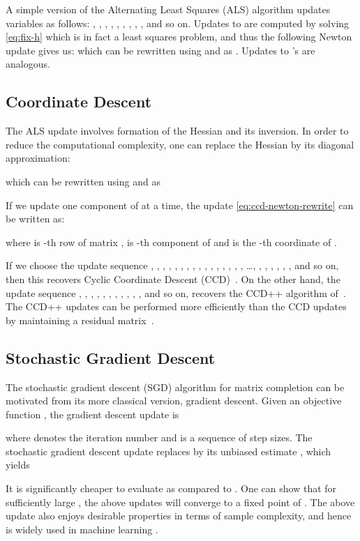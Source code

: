 \documentclass{vldb}
\begin{document}
A simple version of the Alternating Least Squares (ALS) algorithm
updates variables as follows: , , , ,
, , , , ,  and so
on. Updates to  are computed by solving \eqref{eq:fix-h} which
is in fact a least squares problem, and thus the following Newton update
gives us: 
which can be rewritten using  and  as .  Updates to 's are analogous.


\subsection{Coordinate Descent}
\label{sec:CoordinateDescent}

The ALS update involves formation of the Hessian and its inversion.  In
order to reduce the computational complexity, one can replace the
Hessian by its diagonal approximation:

which can be rewritten using  and  as 

If we update one component of  at a time, the update
\eqref{eq:ccd-newton-rewrite} can be written as:

where  is -th row of matrix ,  is -th component
of  and  is the -th coordinate of .

If we choose the update sequence , , , ,
, , , , , , ,
, , , , , \ldots, ,
, , , , , and so on, then this
recovers Cyclic Coordinate Descent (CCD)~\cite{HsiDhi11}. On the other
hand, the update sequence , , , ,
, , , , , , ,
 and so on, recovers the CCD++ algorithm
of~\citet{YuHsiSiDhi12}. The CCD++ updates can be performed more
efficiently than the CCD updates by maintaining a residual
matrix~\citep{YuHsiSiDhi12}.

\subsection{Stochastic Gradient Descent}
\label{sec:StochGradDesc}

The stochastic gradient descent (SGD) algorithm for matrix completion
can be motivated from its more classical version, gradient
descent. Given an objective function , the gradient descent update is

where  denotes the iteration number and  is a sequence
of step sizes. The stochastic gradient descent update replaces
 by its unbiased estimate , which yields

It is significantly cheaper to evaluate 
as compared to . One can show that for
sufficiently large , the above updates will converge to a fixed point
of  \citep{KusCla78,RobMon51}. The above update also enjoys desirable
properties in terms of sample complexity, and hence is widely used in
machine learning \citep{BotBou11,ShaSre08}. 
\end{document}
